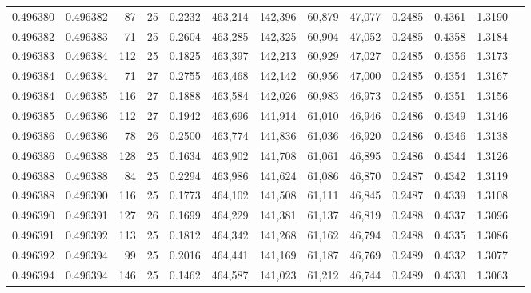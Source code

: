\begin{tabular}{rrrrrrrrrrrrr}
0.496380 & 0.496382 &  87 &  25 &                                     0.2232 & 463,214 & 142,396 &  60,879 &  47,077 & 0.2485 & 0.4361 & 1.3190 \\
0.496382 & 0.496383 &  71 &  25 &                                     0.2604 & 463,285 & 142,325 &  60,904 &  47,052 & 0.2485 & 0.4358 & 1.3184 \\
0.496383 & 0.496384 & 112 &  25 &                                     0.1825 & 463,397 & 142,213 &  60,929 &  47,027 & 0.2485 & 0.4356 & 1.3173 \\
0.496384 & 0.496384 &  71 &  27 &                                     0.2755 & 463,468 & 142,142 &  60,956 &  47,000 & 0.2485 & 0.4354 & 1.3167 \\
0.496384 & 0.496385 & 116 &  27 &                                     0.1888 & 463,584 & 142,026 &  60,983 &  46,973 & 0.2485 & 0.4351 & 1.3156 \\
0.496385 & 0.496386 & 112 &  27 &                                     0.1942 & 463,696 & 141,914 &  61,010 &  46,946 & 0.2486 & 0.4349 & 1.3146 \\
0.496386 & 0.496386 &  78 &  26 &                                     0.2500 & 463,774 & 141,836 &  61,036 &  46,920 & 0.2486 & 0.4346 & 1.3138 \\
0.496386 & 0.496388 & 128 &  25 &                                     0.1634 & 463,902 & 141,708 &  61,061 &  46,895 & 0.2486 & 0.4344 & 1.3126 \\
0.496388 & 0.496388 &  84 &  25 &                                     0.2294 & 463,986 & 141,624 &  61,086 &  46,870 & 0.2487 & 0.4342 & 1.3119 \\
0.496388 & 0.496390 & 116 &  25 &                                     0.1773 & 464,102 & 141,508 &  61,111 &  46,845 & 0.2487 & 0.4339 & 1.3108 \\
0.496390 & 0.496391 & 127 &  26 &                                     0.1699 & 464,229 & 141,381 &  61,137 &  46,819 & 0.2488 & 0.4337 & 1.3096 \\
0.496391 & 0.496392 & 113 &  25 &                                     0.1812 & 464,342 & 141,268 &  61,162 &  46,794 & 0.2488 & 0.4335 & 1.3086 \\
0.496392 & 0.496394 &  99 &  25 &                                     0.2016 & 464,441 & 141,169 &  61,187 &  46,769 & 0.2489 & 0.4332 & 1.3077 \\
0.496394 & 0.496394 & 146 &  25 &                                     0.1462 & 464,587 & 141,023 &  61,212 &  46,744 & 0.2489 & 0.4330 & 1.3063 \\

\end{tabular}
